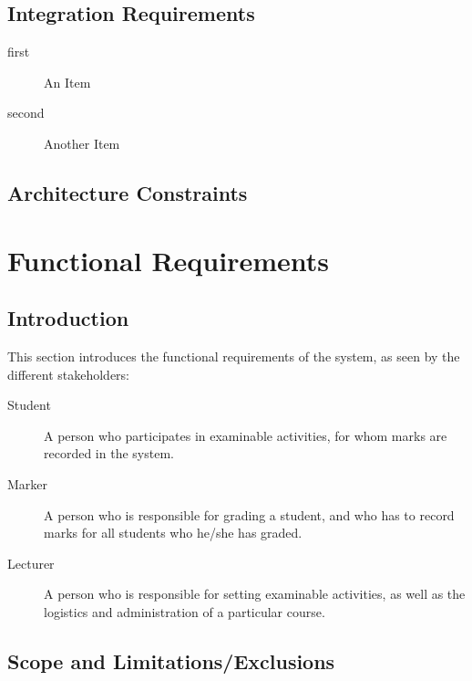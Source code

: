 \documentclass[a4paper]{article}
\begin{document}
		\subsection{Integration Requirements}

			\begin{description}

				\item[first]{An Item}

				\item[second]{Another Item}

			\end{description}

		\subsection{Architecture Constraints}

	\section{Functional Requirements}

		\subsection{Introduction}

			This section introduces the functional requirements of the system, as seen by the different stakeholders:

			\begin{description}

				\item[Student]{A person who participates in examinable activities, for whom marks are recorded in the system.}

				\item[Marker]{A person who is responsible for grading a student, and who has to record marks for all students who he/she has graded.}
				
				\item[Lecturer]{A person who is responsible for setting examinable activities, as well as the logistics and administration of a particular course.}

			\end{description}
			
		\subsection{Scope and Limitations/Exclusions}
		
\end{document}
